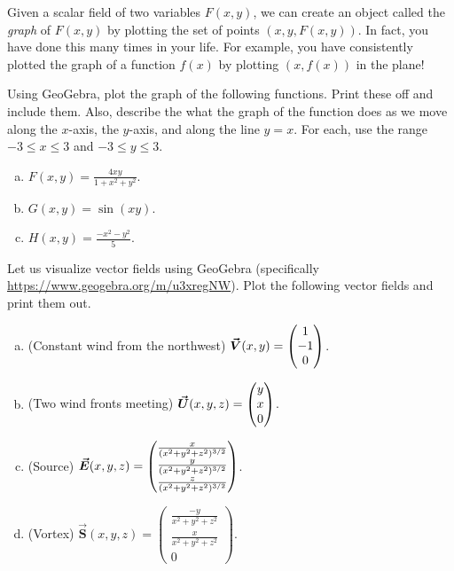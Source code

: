 \documentclass[12pt]{article} %
\begin{document}
\begin{problem}
Given a scalar field of two variables $F(x,y)$, we can create an object called the \emph{graph} of $F(x,y)$ by plotting the set of points $(x,y,F(x,y))$. In fact, you have done this many times in your life. For example, you have consistently plotted the graph of a function $f(x)$ by plotting $(x,f(x))$ in the plane!  

Using GeoGebra, plot the graph of the following functions. Print these off and include them.  Also, describe the what the graph of the function does as we move along the $x$-axis, the $y$-axis, and along the line $y=x$. For each, use the range $-3\leq x \leq 3$ and $-3\leq y \leq 3$.
\begin{enumerate}[(a)]
	\item $F(x,y) = \frac{4xy}{1+x^2+y^2}$.
	\item $G(x,y) = \sin(xy)$.
	\item $H(x,y) = \frac{-x^2-y^2}{5}$.
\end{enumerate}
\end{problem}

\begin{problem} 
Let us visualize vector fields using GeoGebra (specifically \url{https://www.geogebra.org/m/u3xregNW}). Plot the following vector fields and print them out. 
\begin{enumerate}[(a)]
    \item (Constant wind from the northwest) $\boldsymbol{\vec{V}}(x,y)=\begin{pmatrix} 1 \\ -1 \\ 0\end{pmatrix}$.
    \item (Two wind fronts meeting) $\boldsymbol{\vec{U}}(x,y,z)=\begin{pmatrix} y \\ x \\ 0 \end{pmatrix}$.
    \item (Source) $\boldsymbol{\vec{E}}(x,y,z) = \begin{pmatrix} \frac{x}{(x^2+y^2+z^2)^{3/2}} \\ \frac{y}{(x^2+y^2+z^2)^{3/2}} \\ \frac{z}{(x^2+y^2+z^2)^{3/2}} \end{pmatrix}$.
    \item (Vortex) $\boldsymbol{\vec{S}}(x,y,z)=\begin{pmatrix} \frac{-y}{x^2+y^2+z^2} \\ \frac{x}{x^2+y^2+z^2} \\ 0\end{pmatrix}.$           
\end{enumerate}
\end{problem}
\end{document}
